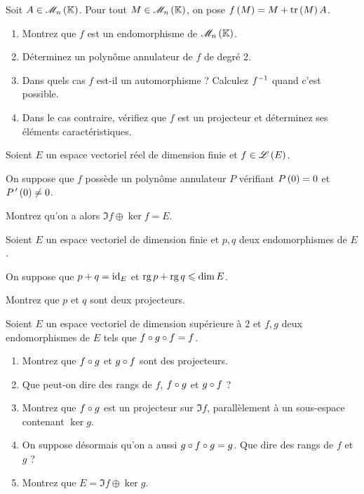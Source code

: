 \begin{exopss}[Exercice 32]
Soit \(A\in\M{n}\). Pour tout \(M\in\M{n}\), on pose \(f\left(M\right)=M+\operatorname{tr}\left(M\right)A\).

\begin{enumerate}
    \item Montrez que \(f\) est un endomorphisme de \(\M{n}\). \\
    \item Déterminez un polynôme annulateur de \(f\) de degré \(2\). \\
    \item Dans quels cas \(f\) est-il un automorphisme ? Calculez \(f^{-1}\) quand c'est possible. \\
    \item Dans le cas contraire, vérifiez que \(f\) est un projecteur et déterminez ses éléments caractéristiques.
\end{enumerate}
\end{exopss}



\begin{exopss}[Exercice 33]
Soient \(E\) un espace vectoriel réel de dimension finie et \(f\in\mathscr{L}\left(E\right)\).

On suppose que \(f\) possède un polynôme annulateur \(P\) vérifiant \(P\left(0\right)=0\) et \(P^{\,\prime}\left(0\right)\not=0\).

Montrez qu'on a alors \(\Im f\oplus\ker f=E\).
\end{exopss}



\begin{exo}
Soient \(E\) un espace vectoriel de dimension finie et \(p,q\) deux endomorphismes de \(E\).

On suppose que \(p+q=\mathrm{id}_{E}\) et \(\operatorname{rg} p+\operatorname{rg} q\leqslant\dim E\).

Montrez que \(p\) et \(q\) sont deux projecteurs.
\end{exo}



\begin{exo}
Soient \(E\) un espace vectoriel de dimension supérieure à \(2\) et \(f,g\) deux endomorphismes de \(E\) tels que \(f\circ g\circ f=f\).

\begin{enumerate}
    \item Montrez que \(f\circ g\) et \(g\circ f\) sont des projecteurs. \\
    \item Que peut-on dire des rangs de \(f\), \(f\circ g\) et \(g\circ f\) ? \\
    \item Montrez que \(f\circ g\) est un projecteur sur \(\Im f\), parallèlement à un sous-espace contenant \(\ker g\). \\
    \item On suppose désormais qu'on a aussi \(g\circ f\circ g=g\). Que dire des rangs de \(f\) et \(g\) ? \\
    \item Montrez que \(E=\Im f\oplus\ker g\).
\end{enumerate}
\end{exo}



